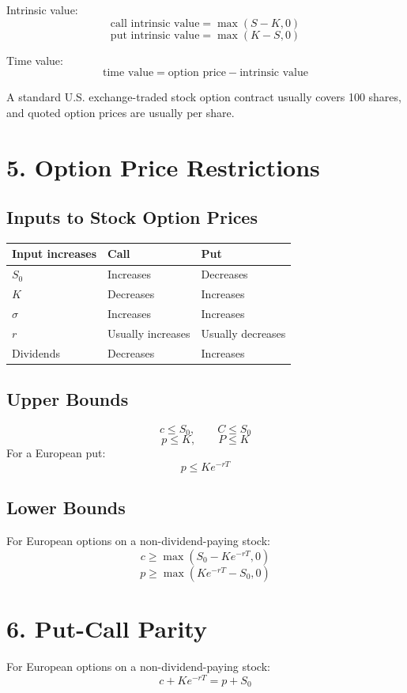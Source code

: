 \documentclass[10pt]{article}
\newcommand{\formula}[1]{\[
    \boxed{\displaystyle #1}
\]}
\begin{document}
\begin{multicols}{2}
Intrinsic value:
\formula{\text{call intrinsic value}=\max(S-K,0)}
\formula{\text{put intrinsic value}=\max(K-S,0)}

Time value:
\formula{\text{time value}=\text{option price}-\text{intrinsic value}}

A standard U.S. exchange-traded stock option contract usually covers 100 shares, and quoted option prices are usually per share.

\section*{5. Option Price Restrictions}

\subsection*{Inputs to Stock Option Prices}
\begin{center}
{\footnotesize
\begin{tabular}{@{}lll@{}}
\toprule
Input increases & Call & Put \\
\midrule
$S_0$ & Increases & Decreases \\
$K$ & Decreases & Increases \\
$\sigma$ & Increases & Increases \\
$r$ & Usually increases & Usually decreases \\
Dividends & Decreases & Increases \\
\bottomrule
\end{tabular}
}
\end{center}

\subsection*{Upper Bounds}
\formula{c\leq S_0,\qquad C\leq S_0}
\formula{p\leq K,\qquad P\leq K}
For a European put:
\formula{p\leq Ke^{-rT}}

\subsection*{Lower Bounds}
For European options on a non-dividend-paying stock:
\formula{c\geq \max(S_0-Ke^{-rT},0)}
\formula{p\geq \max(Ke^{-rT}-S_0,0)}

\section*{6. Put-Call Parity}

For European options on a non-dividend-paying stock:
\formula{c+Ke^{-rT}=p+S_0}


\end{multicols}
\end{document}
